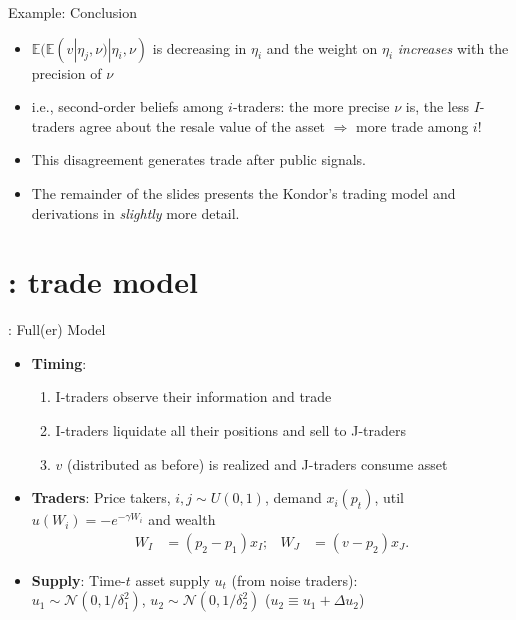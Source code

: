 \documentclass[english,10pt
,aspectratio=169
]{beamer}
\begin{document}
\begin{frame}{Example: Conclusion}
	\begin{itemize}
		\item $\mathbb{E}(\mathbb{E}(v|\eta_j,\nu)|\eta_i,\nu)$ is \alert{decreasing in $\eta_i$} and the weight on $\eta_i$ \emph{increases} with the precision of $\nu$
		\item i.e., second-order beliefs  among $i$-traders: the more precise $\nu$ is, the less $I$-traders agree about the resale value of the asset $\Rightarrow$ more trade among $i$!
		\item This disagreement generates trade after public signals.
		\item The remainder of the slides presents the Kondor's trading model and derivations in \emph{slightly} more detail.
	\end{itemize}
\end{frame}



\section{\cite{kondor_more_2012}: trade model}


\begin{frame}{\cite{kondor_more_2012}: Full(er) Model}
	\begin{itemize}
		\item \textbf{Timing}: 
		\begin{enumerate}
			\item I-traders observe their information and trade
			\item I-traders liquidate all their positions and sell to J-traders
			\item $v$ (distributed as before) is realized and J-traders consume asset
		\end{enumerate}
		\item \textbf{Traders}: Price takers, $i, j \sim U(0,1)$, demand $x_i(p_t)$, util $u(W_i)=-e^{-\gamma W_i}$ and  wealth 
		\begin{align*}
			W_I & = (p_2-p_1){x_I}; &
			W_J & = (v-p_2){x_J}.
		\end{align*}
		\item \textbf{Supply}: Time-$t$ asset supply  $u_t$ (from noise traders): \\$u_1 \sim \mathcal{N}(0,1/\delta^2_1)$, $u_2\sim \mathcal{N}(0,1/\delta^2_2)$ ($u_2 \equiv u_1 + \varDelta u_2$)
	\end{itemize}
\end{frame}
\end{document}
